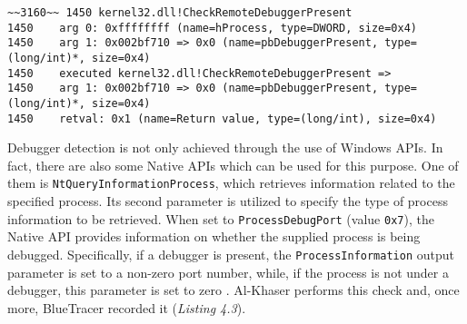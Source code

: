 \vspace{0.5cm}
\begin{lstlisting}[caption={Log entry relative to \texttt{CheckRemoteDebuggerPresent}},captionpos=b]
~~3160~~ 1450 kernel32.dll!CheckRemoteDebuggerPresent
1450 	arg 0: 0xffffffff (name=hProcess, type=DWORD, size=0x4)
1450 	arg 1: 0x002bf710 => 0x0 (name=pbDebuggerPresent, type=(long/int)*, size=0x4)
1450    executed kernel32.dll!CheckRemoteDebuggerPresent =>
1450 	arg 1: 0x002bf710 => 0x0 (name=pbDebuggerPresent, type=(long/int)*, size=0x4)
1450 	retval: 0x1 (name=Return value, type=(long/int), size=0x4)
\end{lstlisting}

Debugger detection is not only achieved through the use of Windows APIs. In fact, there are also some Native APIs which can be used for this purpose. One of them is \texttt{NtQueryInformationProcess}, which retrieves information related to the specified process. Its second parameter is utilized to specify the type of process information to be retrieved. When set to \texttt{ProcessDebugPort} (value \texttt{0x7}), the Native API provides information on whether the supplied process is being debugged. Specifically, if a debugger is present, the \texttt{ProcessInformation} output parameter is set to a non-zero port number, while, if the process is not under a debugger, this parameter is set to zero \cite{Sikorski:2012:PMA:2181153}. Al-Khaser performs this check and, once more, BlueTracer recorded it (\textit{Listing 4.3}).

